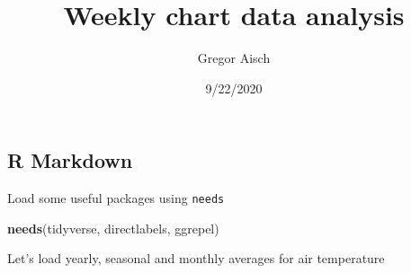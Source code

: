 \documentclass[
]{article}
\title{Weekly chart data analysis}
\author{Gregor Aisch}
\date{9/22/2020}
\newenvironment{Shaded}{\begin{snugshade}}{\end{snugshade}}
\newcommand{\KeywordTok}[1]{\textcolor[rgb]{0.13,0.29,0.53}{\textbf{#1}}}
\newcommand{\NormalTok}[1]{#1}
\begin{document}
\maketitle

\hypertarget{r-markdown}{%
\subsection{R Markdown}\label{r-markdown}}

Load some useful packages using \texttt{needs}

\begin{Shaded}
\begin{Highlighting}[]
\KeywordTok{needs}\NormalTok{(tidyverse, directlabels, ggrepel)}
\end{Highlighting}
\end{Shaded}

Let's load yearly, seasonal and monthly averages for air temperature
\end{document}
